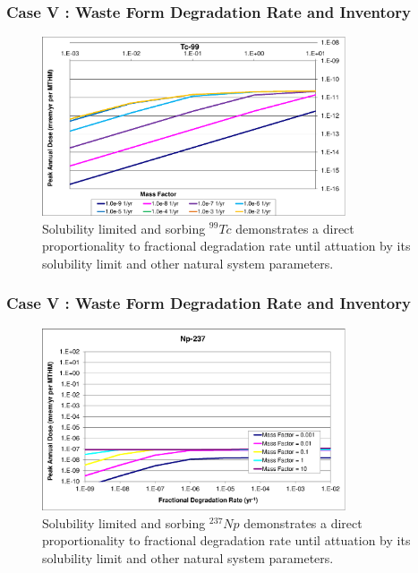 \begin{frame}[c]
  \frametitle{Case V : Waste Form Degradation Rate and Inventory}

\begin{figure}[ht!]
\centering
\includegraphics[width=0.8\textwidth]{WFDegAndInv/Tc-99-MF.eps}
\caption{
  Solubility limited and sorbing $^{99}Tc$ demonstrates a direct proportionality 
to fractional degradation rate until attuation by its solubility limit and other 
natural system parameters. } 
\label{fig:WFDegTc99MF}
\end{figure}

\end{frame}

\begin{frame}[c]
  \frametitle{Case V : Waste Form Degradation Rate and Inventory}

\begin{figure}[ht!]
\centering
\includegraphics[width=0.8\textwidth]{WFDegAndInv/Np-237.eps}
\caption{
  Solubility limited and sorbing $^{237}Np$ demonstrates a direct proportionality 
to fractional degradation rate until attuation by its solubility limit and other 
natural system parameters. } 
\label{fig:WFDegNp237}
\end{figure}
\end{frame}

